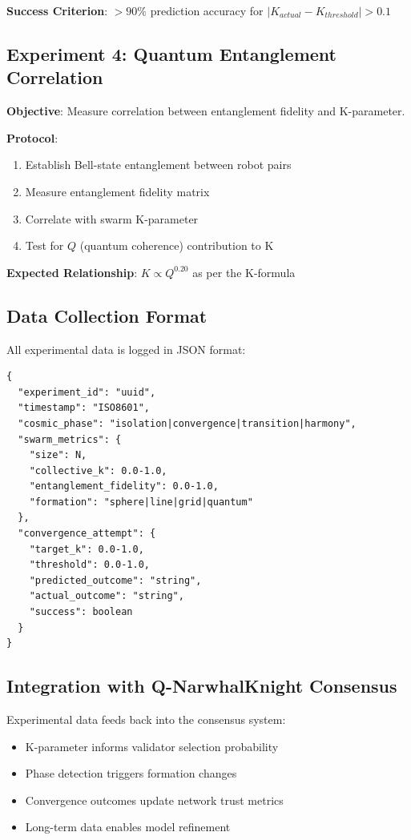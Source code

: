 \documentclass[12pt,a4paper]{article}
\begin{document}
\textbf{Success Criterion}: $>90\%$ prediction accuracy for $|K_{actual} - K_{threshold}| > 0.1$

\subsection{Experiment 4: Quantum Entanglement Correlation}

\textbf{Objective}: Measure correlation between entanglement fidelity and K-parameter.

\textbf{Protocol}:
\begin{enumerate}
    \item Establish Bell-state entanglement between robot pairs
    \item Measure entanglement fidelity matrix
    \item Correlate with swarm K-parameter
    \item Test for $Q$ (quantum coherence) contribution to K
\end{enumerate}

\textbf{Expected Relationship}: $K \propto Q^{0.20}$ as per the K-formula

\subsection{Data Collection Format}

All experimental data is logged in JSON format:

\begin{verbatim}
{
  "experiment_id": "uuid",
  "timestamp": "ISO8601",
  "cosmic_phase": "isolation|convergence|transition|harmony",
  "swarm_metrics": {
    "size": N,
    "collective_k": 0.0-1.0,
    "entanglement_fidelity": 0.0-1.0,
    "formation": "sphere|line|grid|quantum"
  },
  "convergence_attempt": {
    "target_k": 0.0-1.0,
    "threshold": 0.0-1.0,
    "predicted_outcome": "string",
    "actual_outcome": "string",
    "success": boolean
  }
}
\end{verbatim}

\subsection{Integration with Q-NarwhalKnight Consensus}

Experimental data feeds back into the consensus system:
\begin{itemize}
    \item K-parameter informs validator selection probability
    \item Phase detection triggers formation changes
    \item Convergence outcomes update network trust metrics
    \item Long-term data enables model refinement
\end{itemize}
\end{document}

